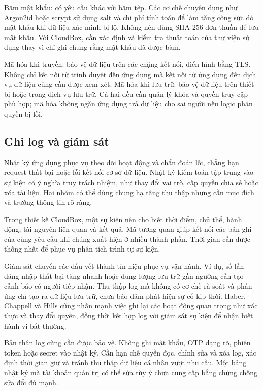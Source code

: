 Băm mật khẩu: có yêu cầu khác với băm tệp. Các cơ chế chuyên dụng như Argon2id hoặc scrypt sử dụng salt và chi phí tính toán để làm tăng công sức dò mật khẩu khi dữ liệu xác minh bị lộ. Không nên dùng SHA-256 đơn thuần để lưu mật khẩu. Với CloudBox, cần xác định và kiểm tra thuật toán của thư viện sử dụng thay vì chỉ ghi chung rằng mật khẩu đã được băm.\cite{password}

Mã hóa khi truyền: bảo vệ dữ liệu trên các chặng kết nối, điển hình bằng TLS. Không chỉ kết nối từ trình duyệt đến ứng dụng mà kết nối từ ứng dụng đến dịch vụ dữ liệu cũng cần được xem xét. Mã hóa khi lưu trữ: bảo vệ dữ liệu trên thiết bị hoặc trong dịch vụ lưu trữ. Cả hai đều cần quản lý khóa và quyền truy cập phù hợp; mã hóa không ngăn ứng dụng trả dữ liệu cho sai người nếu logic phân quyền bị lỗi.

\subsection{Ghi log và giám sát}
Nhật ký ứng dụng phục vụ theo dõi hoạt động và chẩn đoán lỗi, chẳng hạn request thất bại hoặc lỗi kết nối cơ sở dữ liệu. Nhật ký kiểm toán tập trung vào sự kiện có ý nghĩa truy trách nhiệm, như thay đổi vai trò, cấp quyền chia sẻ hoặc xóa tài liệu. Hai nhóm có thể dùng chung hạ tầng thu thập nhưng cần mục đích và trường thông tin rõ ràng.

Trong thiết kế CloudBox, một sự kiện nên cho biết thời điểm, chủ thể, hành động, tài nguyên liên quan và kết quả. Mã tương quan giúp kết nối các bản ghi của cùng yêu cầu khi chúng xuất hiện ở nhiều thành phần. Thời gian cần được thống nhất để phục vụ phân tích trình tự sự kiện.

Giám sát chuyển các dấu vết thành tín hiệu phục vụ vận hành. Ví dụ, số lần đăng nhập thất bại tăng nhanh hoặc dung lượng lưu trữ gần ngưỡng cần tạo cảnh báo có người tiếp nhận. Thu thập log mà không có cơ chế rà soát và phản ứng chỉ tạo ra dữ liệu lưu trữ, chưa bảo đảm phát hiện sự cố kịp thời. Haber, Chappell và Hills cũng nhấn mạnh việc ghi lại các hoạt động quan trọng như xác thực và thay đổi quyền, đồng thời kết hợp log với giám sát sự kiện để nhận biết hành vi bất thường.\cite[tr.~139--140]{cloudattacks}

Bản thân log cũng cần được bảo vệ. Không ghi mật khẩu, OTP dạng rõ, phiên token hoặc secret vào nhật ký. Cần hạn chế quyền đọc, chỉnh sửa và xóa log, xác định thời gian giữ và tránh thu thập dữ liệu cá nhân vượt nhu cầu. Một bảng nhật ký mà tài khoản quản trị có thể sửa tùy ý chưa cung cấp bằng chứng chống sửa đổi đủ mạnh.

